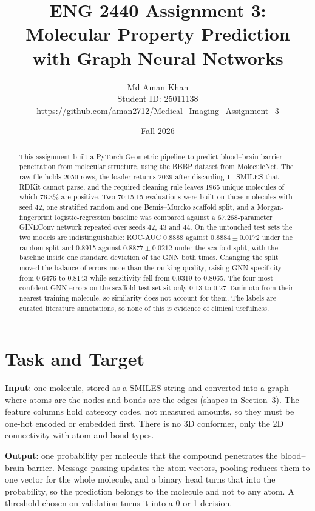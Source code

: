 \documentclass[10pt,a4paper]{article}
\title{ENG 2440 Assignment 3: Molecular Property Prediction with Graph Neural Networks}
\author{Md Aman Khan\\Student ID: 25011138\\\url{https://github.com/aman2712/Medical_Imaging_Assignment_3}}
\date{Fall 2026}
\begin{document}
\maketitle
\vspace*{-0.2in}

\begin{abstract}
This assignment built a PyTorch Geometric pipeline to predict blood--brain barrier penetration from molecular structure, using the BBBP dataset from MoleculeNet. The raw file holds 2050 rows, the loader returns 2039 after discarding 11 SMILES that RDKit cannot parse, and the required cleaning rule leaves 1965 unique molecules of which 76.3\% are positive. Two 70:15:15 evaluations were built on those molecules with seed 42, one stratified random and one Bemis--Murcko scaffold split, and a Morgan-fingerprint logistic-regression baseline was compared against a 67{,}268-parameter GINEConv network repeated over seeds 42, 43 and 44. On the untouched test sets the two models are indistinguishable: ROC-AUC 0.8888 against $0.8884 \pm 0.0172$ under the random split and 0.8915 against $0.8877 \pm 0.0212$ under the scaffold split, with the baseline inside one standard deviation of the GNN both times. Changing the split moved the balance of errors more than the ranking quality, raising GNN specificity from 0.6476 to 0.8143 while sensitivity fell from 0.9319 to 0.8065. The four most confident GNN errors on the scaffold test set sit only 0.13 to 0.27 Tanimoto from their nearest training molecule, so similarity does not account for them. The labels are curated literature annotations, so none of this is evidence of clinical usefulness.
\end{abstract}

\section{Task and Target}
\textbf{Input}: one molecule, stored as a SMILES string and converted into a graph where atoms are the nodes and bonds are the edges (shapes in Section~3). The feature columns hold category codes, not measured amounts, so they must be one-hot encoded or embedded first. There is no 3D conformer, only the 2D connectivity with atom and bond types.

\textbf{Output}: one probability per molecule that the compound penetrates the blood--brain barrier. Message passing updates the atom vectors, pooling reduces them to one vector for the whole molecule, and a binary head turns that into the probability, so the prediction belongs to the molecule and not to any atom. A threshold chosen on validation turns it into a 0 or 1 decision.
\end{document}

